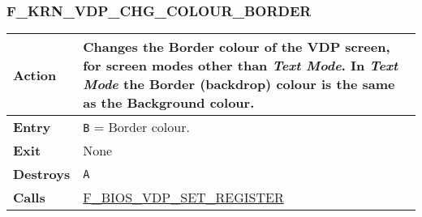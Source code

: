     \subsubsection{F\_KRN\_VDP\_CHG\_COLOUR\_BORDER}
    \label{func:fkrnvdpchgcolourborder}
    \begin{tabular}{l p{9cm}}
        \hline\textbf{Action}
        & Changes the Border colour of the \textbf{VDP} screen, for screen
        modes other than \textit{Text Mode}. In \textit{Text Mode} the
        Border (backdrop) colour is the same as the Background colour.\\
        \hline\textbf{Entry} & \texttt{B} = Border colour.\\
        \hline\textbf{Exit} & None\\
        \hline\textbf{Destroys} & \texttt{A}\\
        \hline\textbf{Calls}
        & \hyperref[func:fbiosvdpsetregister]{F\_BIOS\_VDP\_SET\_REGISTER}\\
        \hline
    \end{tabular}